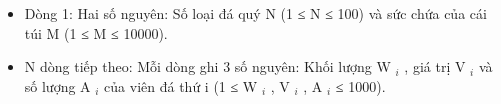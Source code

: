\begin{itemize}
	\item     Dòng 1: Hai số nguyên: Số loại đá quý N (1 ≤ N ≤ 100) và sức chứa của cái túi M (1 ≤ M ≤ 10000).   
	\item     N dòng tiếp theo: Mỗi dòng ghi 3 số nguyên: Khối lượng W    $_     i    $    , giá trị V    $_     i    $    và số lượng A    $_     i    $    của viên đá thứ i (1 ≤ W    $_     i    $    , V    $_     i    $    , A    $_     i    $    ≤ 1000).   
\end{itemize}
